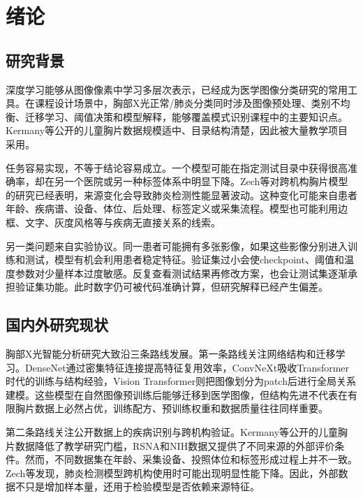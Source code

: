 \chapter{绪论}

\section{研究背景}

深度学习能够从图像像素中学习多层次表示，已经成为医学图像分类研究的常用工具\cite{litjens2017survey}。在课程设计场景中，胸部X光正常/肺炎分类同时涉及图像预处理、类别不均衡、迁移学习、阈值决策和模型解释，能够覆盖模式识别课程中的主要知识点。Kermany等公开的儿童胸片数据规模适中、目录结构清楚，因此被大量教学项目采用\cite{kermany2018,kermanydata2018}。

任务容易实现，不等于结论容易成立。一个模型可能在指定测试目录中获得很高准确率，却在另一个医院或另一种标签体系中明显下降。Zech等对跨机构胸片模型的研究已经表明，来源变化会导致肺炎检测性能显著波动\cite{zech2018}。这种变化可能来自患者年龄、疾病谱、设备、体位、后处理、标签定义或采集流程。模型也可能利用边框、文字、灰度风格等与疾病无直接关系的线索。

另一类问题来自实验协议。同一患者可能拥有多张影像，如果这些影像分别进入训练和测试，模型有机会利用患者稳定特征。验证集过小会使checkpoint、阈值和温度参数对少量样本过度敏感。反复查看测试结果再修改方案，也会让测试集逐渐承担验证集功能。此时数字仍可被代码准确计算，但研究解释已经产生偏差。

\section{国内外研究现状}

胸部X光智能分析研究大致沿三条路线发展。第一条路线关注网络结构和迁移学习。DenseNet通过密集特征连接提高特征复用效率，ConvNeXt吸收Transformer时代的训练与结构经验，Vision Transformer则把图像划分为patch后进行全局关系建模\cite{huang2017densenet,liu2022convnext,dosovitskiy2021vit}。这些模型在自然图像预训练后能够迁移到医学图像，但结构先进不代表在有限胸片数据上必然占优，训练配方、预训练权重和数据质量往往同样重要。

第二条路线关注公开数据上的疾病识别与跨机构验证。Kermany等公开的儿童胸片数据降低了教学研究门槛\cite{kermany2018}，RSNA和NIH数据又提供了不同来源的外部评价条件。然而，不同数据集在年龄、采集设备、投照体位和标签形成过程上并不一致。Zech等发现，肺炎检测模型跨机构使用时可能出现明显性能下降\cite{zech2018}。因此，外部数据不只是增加样本量，还用于检验模型是否依赖来源特征。

